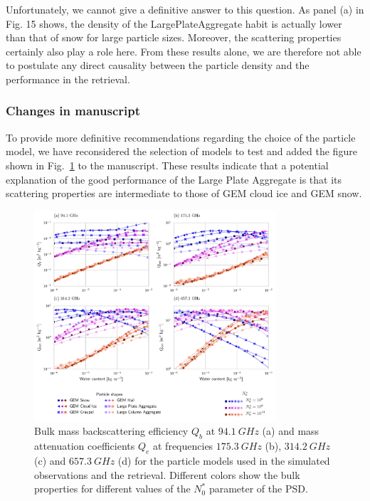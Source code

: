 Unfortunately, we cannot give a definitive answer to this question. As panel (a)
in Fig. 15 shows, the density of the LargePlateAggregate habit is actually lower
than that of snow for large particle sizes. Moreover, the scattering properties
certainly also play a role here. From these results alone, we are therefore not able to
postulate any direct causality between the particle density and the performance
in the retrieval.

\subsubsection*{Changes in manuscript}

To provide more definitive recommendations regarding the choice of the particle
model, we have reconsidered the selection of models to test and added the figure
shown in Fig.~\ref{fig:particle_properties} to the manuscript. These results
indicate that a potential explanation of the good performance of the Large Plate
Aggregate is that its scattering properties are intermediate to those of
GEM cloud ice and GEM snow.


\begin{figure}
  \centering
  \includegraphics[width=0.8\textwidth]{../plots/particle_properties_d14}
  \caption{Bulk mass backscattering efficiency $Q_b$ at $94.1\ \unit{GHz}$ (a)
    and mass attenuation coefficients $Q_{e}$ at frequencies $175.3\ \unit{GHz}$
    (b), $314.2\ \unit{GHz}$ (c) and $657.3\ \unit{GHz}$ (d) for the particle
    models used in the simulated observations and the retrieval. Different
    colors show the bulk properties for different values of the $N_0^*$
    parameter of the PSD.}
  \label{fig:particle_properties}
\end{figure}
